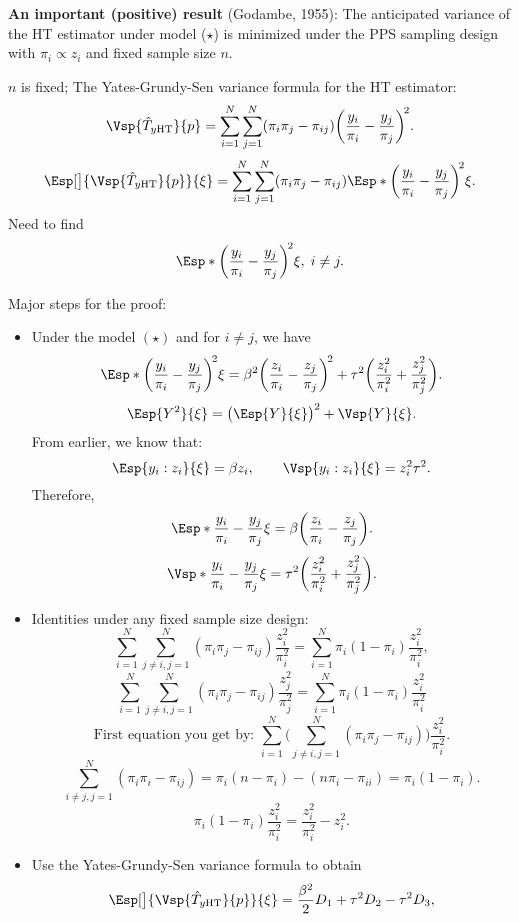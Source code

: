 \textbf{An important (positive) result} (Godambe, 1955): The anticipated
variance of the HT estimator under model ($ \star $) is minimized under the
PPS sampling design with $ \pi_i\propto z_i $ and fixed sample size $n$.

$ n $ is fixed; The Yates-Grundy-Sen variance formula for the HT estimator:
\[ \Vsp{\hat{T}_{y\HT}}{p}=\sum_{i=1}^{N}\sum_{j=1}^{N}(\pi_i\pi_j-\pi_{ij})\biggl(\frac{y_i}{\pi_i}-\frac{y_j}{\pi_j}\biggr)^{\!2}. \]
\[ \Esp[\big]{\Vsp{\hat{T}_{y\HT}}{p}}{\xi}=\sum_{i=1}^{N}\sum_{j=1}^{N}(\pi_i\pi_j-\pi_{ij})\Esp*{\biggl(\frac{y_i}{\pi_i}-\frac{y_j}{\pi_j}\biggr)^{\!2}}{\xi}. \]
Need to find
\[ \Esp*{\biggl(\frac{y_i}{\pi_i}-\frac{y_j}{\pi_j}\biggr)^{\!2}}{\xi},\; i\ne j. \]

Major steps for the proof:
\begin{itemize}
      \item Under the model $ (\star) $ and for $ i\ne j $, we have
            \[ \Esp*{\biggl(\frac{y_i}{\pi_i}-\frac{y_j}{\pi_j}\biggr)^{\!2}}{\xi}=\beta^2\biggl(\frac{z_i}{\pi_i}-\frac{z_j}{\pi_j}\biggr)^{\!2}+
                  \tau^2\biggl(\frac{z_i^2}{\pi_i^2}+\frac{z_j^2}{\pi_j^2}\biggr). \]
            \[ \Esp{Y^2}{\xi}=\bigl(\Esp{Y}{\xi}\bigr)^2+\Vsp{Y}{\xi}. \]
            From earlier, we know that:
            \[ \Esp{y_i\given z_i}{\xi}=\beta z_i,\qquad \Vsp{y_i\given z_i}{\xi}=z_i^2\tau^2. \]
            Therefore,
            \[ \Esp*{\frac{y_i}{\pi_i}-\frac{y_j}{\pi_j}}{\xi}=\beta\biggl(\frac{z_i}{\pi_i}-\frac{z_j}{\pi_j}\biggr). \]
            \[ \Vsp*{\frac{y_i}{\pi_i}-\frac{y_j}{\pi_j}}{\xi}=\tau^2\biggl(\frac{z_i^2}{\pi_i^2}+\frac{z_j^2}{\pi_j^2}\biggr). \]
      \item Identities under any fixed sample size design:
            \[ \sum_{i=1}^{N}\sum_{j\ne i,j=1}^{N}(\pi_i\pi_j-\pi_{ij})\frac{z_i^2}{\pi_i^2}=\sum_{i=1}^{N}\pi_i(1-\pi_i)\frac{z_i^2}{\pi_i^2}, \]
            \[ \sum_{i=1}^{N}\sum_{j\ne i,j=1}^{N}(\pi_i\pi_j-\pi_{ij})\frac{z_j^2}{\pi_j^2}=\sum_{i=1}^{N}\pi_i(1-\pi_i)\frac{z_i^2}{\pi_i^2} \]
            \[ \text{First equation you get by: }\sum_{i=1}^{N}\biggl(\sum_{j\ne i,j=1}^{N}(\pi_i\pi_j-\pi_{ij})\biggr)\frac{z_i^2}{\pi_i^2}. \]
            \[ \sum_{i\ne j,j=1}^{N}(\pi_i\pi_i-\pi_{ij})=\pi_i(n-\pi_i)-(n\pi_i-\pi_{ii})=\pi_i(1-\pi_i). \]
            \[ \pi_i(1-\pi_i)\frac{z_i^2}{\pi_i^2}=\frac{z_i^2}{\pi_i^2}-z_i^2. \]
      \item Use the Yates-Grundy-Sen variance formula to obtain
            \[  \Esp[\big]{\Vsp{\hat{T}_{y\HT}}{p}}{\xi}=\frac{\beta^2}{2}D_1+\tau^2 D_2-\tau^2 D_3, \]

\end{itemize}
